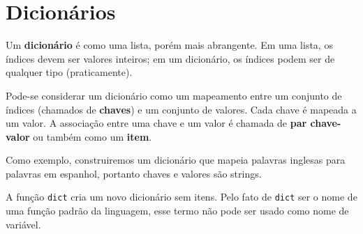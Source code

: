 
\chapter{Dicionários}



Um {\bf dicionário} é como uma lista, porém mais abrangente. Em uma lista,
os índices devem ser valores inteiros; em um dicionário,
os índices podem ser de qualquer tipo (praticamente).

Pode-se considerar um dicionário como um mapeamento entre um conjunto de
índices (chamados de {\bf chaves}) e um conjunto de valores. Cada chave é
mapeada a um valor. A associação entre uma chave e um valor é chamada de
{\bf par chave-valor} ou também como um {\bf item}.

Como exemplo, construiremos um dicionário que mapeia palavras inglesas para
palavras em espanhol, portanto chaves e valores são strings.

A função {\tt dict} cria um novo dicionário sem itens. Pelo fato de {\tt dict} ser o
nome de uma função padrão da linguagem, esse termo não pode ser usado como nome de variável.


